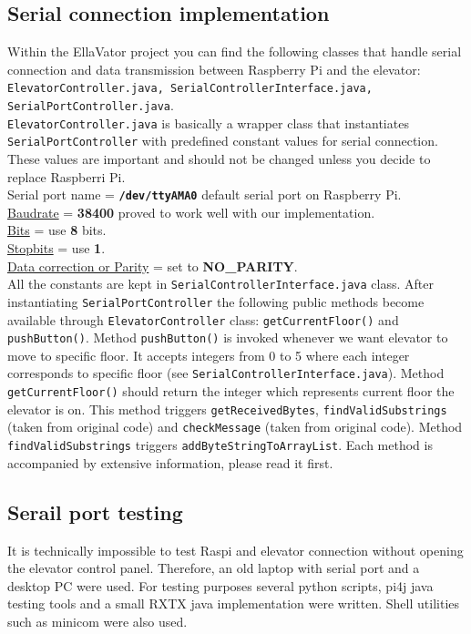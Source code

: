 \documentclass[a4paper, 12pt]{article}
\begin{document}
\subsection{Serial connection implementation}
Within the EllaVator project you can find the following classes that handle serial connection and data transmission between Raspberry Pi and the elevator: \texttt{ElevatorController.java, SerialControllerInterface.java, SerialPortController.java}.\\
\texttt{ElevatorController.java} is basically a wrapper class that instantiates \texttt{SerialPortController} with predefined constant values for serial connection.
These values are important and should not be changed unless you decide to replace Raspberri Pi.\\
Serial port name = \textbf{\texttt{/dev/ttyAMA0}} default serial port on Raspberry Pi.\\
\href{https://en.wikipedia.org/wiki/Serial\_port\#Speed}{Baudrate} = \textbf{38400} proved to work well with our implementation.\\
\href{https://en.wikipedia.org/wiki/Serial\_port\#Data_bits}{Bits} = use \textbf{8} bits.\\
\href{https://en.wikipedia.org/wiki/Serial\_port\#Stop_bits}{Stopbits} = use \textbf{1}.\\
\href{https://en.wikipedia.org/wiki/Serial\_port\#Parity}{Data correction or Parity} = set to \textbf{NO\_PARITY}.\\

All the constants are kept in \texttt{SerialControllerInterface.java} class.
After instantiating \texttt{SerialPortController} the following public methods become available through \texttt{ElevatorController} class: \texttt{getCurrentFloor()} and \texttt{pushButton()}. 
Method \texttt{pushButton()} is invoked whenever we want elevator to move to specific floor.
It accepts integers from 0 to 5 where each integer corresponds to specific floor (see \texttt{SerialControllerInterface.java}). 
Method \texttt{getCurrentFloor()} should return the integer which represents current floor the elevator is on.
This method triggers \texttt{getReceivedBytes}, \texttt{findValidSubstrings} (taken from original code) and \texttt{checkMessage} (taken from original code).
Method \texttt{findValidSubstrings} triggers \texttt{addByteStringToArrayList}.
Each method is accompanied by extensive information, please read it first.

\subsection{Serail port testing}
It is technically impossible to test Raspi and elevator connection without opening the elevator control panel.
Therefore, an old laptop with serial port and a desktop PC were used.
For testing purposes several python scripts, pi4j java testing tools and a small RXTX java implementation were written.
Shell utilities such as minicom were also used.
\\
\end{document}
